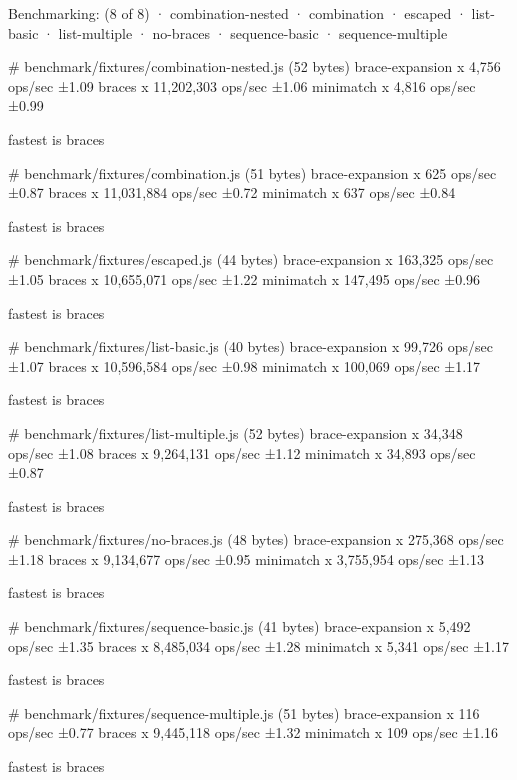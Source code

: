 \begin{DoxyCode}
Benchmarking: (8 of 8)
 · combination-nested
 · combination
 · escaped
 · list-basic
 · list-multiple
 · no-braces
 · sequence-basic
 · sequence-multiple

# benchmark/fixtures/combination-nested.js (52 bytes)
  brace-expansion x 4,756 ops/sec ±1.09%
  braces x 11,202,303 ops/sec ±1.06%
  minimatch x 4,816 ops/sec ±0.99%

  fastest is braces

# benchmark/fixtures/combination.js (51 bytes)
  brace-expansion x 625 ops/sec ±0.87%
  braces x 11,031,884 ops/sec ±0.72%
  minimatch x 637 ops/sec ±0.84%

  fastest is braces

# benchmark/fixtures/escaped.js (44 bytes)
  brace-expansion x 163,325 ops/sec ±1.05%
  braces x 10,655,071 ops/sec ±1.22%
  minimatch x 147,495 ops/sec ±0.96%

  fastest is braces

# benchmark/fixtures/list-basic.js (40 bytes)
  brace-expansion x 99,726 ops/sec ±1.07%
  braces x 10,596,584 ops/sec ±0.98%
  minimatch x 100,069 ops/sec ±1.17%

  fastest is braces

# benchmark/fixtures/list-multiple.js (52 bytes)
  brace-expansion x 34,348 ops/sec ±1.08%
  braces x 9,264,131 ops/sec ±1.12%
  minimatch x 34,893 ops/sec ±0.87%

  fastest is braces

# benchmark/fixtures/no-braces.js (48 bytes)
  brace-expansion x 275,368 ops/sec ±1.18%
  braces x 9,134,677 ops/sec ±0.95%
  minimatch x 3,755,954 ops/sec ±1.13%

  fastest is braces

# benchmark/fixtures/sequence-basic.js (41 bytes)
  brace-expansion x 5,492 ops/sec ±1.35%
  braces x 8,485,034 ops/sec ±1.28%
  minimatch x 5,341 ops/sec ±1.17%

  fastest is braces

# benchmark/fixtures/sequence-multiple.js (51 bytes)
  brace-expansion x 116 ops/sec ±0.77%
  braces x 9,445,118 ops/sec ±1.32%
  minimatch x 109 ops/sec ±1.16%

  fastest is braces
\end{DoxyCode}


